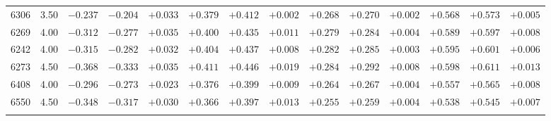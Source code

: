 \documentclass[]{aa}
\begin{document}
\begin{appendix}
\begin{table*}
\begin{center}
\begin{tabular}{llllllllllllll}
6306  &3.50& $ -0.237$&$  -0.204$&$  +0.033$&$  +0.379$&$  +0.412$&$  +0.002$&$  +0.268$&$  +0.270$&$  +0.002$&$  +0.568$&$  +0.573$&$  +0.005$\\
6269  &4.00& $ -0.312$&$  -0.277$&$  +0.035$&$  +0.400$&$  +0.435$&$  +0.011$&$  +0.279$&$  +0.284$&$  +0.004$&$  +0.589$&$  +0.597$&$  +0.008$\\
6242  &4.00& $ -0.315$&$  -0.282$&$  +0.032$&$  +0.404$&$  +0.437$&$  +0.008$&$  +0.282$&$  +0.285$&$  +0.003$&$  +0.595$&$  +0.601$&$  +0.006$\\
6273  &4.50& $ -0.368$&$  -0.333$&$  +0.035$&$  +0.411$&$  +0.446$&$  +0.019$&$  +0.284$&$  +0.292$&$  +0.008$&$  +0.598$&$  +0.611$&$  +0.013$\\
6408  &4.00& $ -0.296$&$  -0.273$&$  +0.023$&$  +0.376$&$  +0.399$&$  +0.009$&$  +0.264$&$  +0.267$&$  +0.004$&$  +0.557$&$  +0.565$&$  +0.008$\\
6550  &4.50& $ -0.348$&$  -0.317$&$  +0.030$&$  +0.366$&$  +0.397$&$  +0.013$&$  +0.255$&$  +0.259$&$  +0.004$&$  +0.538$&$  +0.545$&$  +0.007$\\
\hline\noalign{\smallskip}
\hline\noalign{\smallskip}
\end{tabular}
\end{center}
\end{table*}


\end{appendix}
\end{document}
